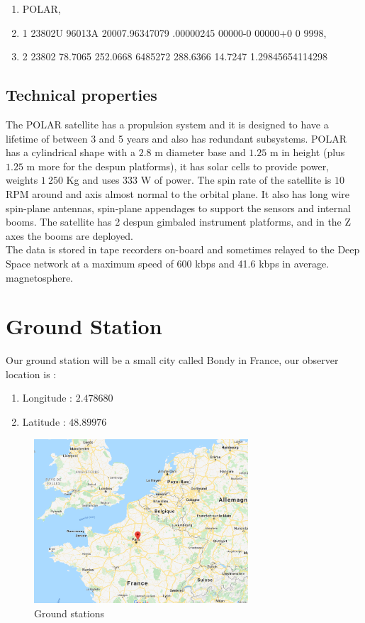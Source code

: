 \documentclass[a4paper,12pt,calibri,oneside,openany]{book}
\theoremstyle{break}
\begin{document}
\begin{enumerate}
	\item POLAR,                  
	\item 1 23802U 96013A   20007.96347079  .00000245  00000-0  00000+0 0  9998,
	\item 2 23802  78.7065 252.0668 6485272 288.6366  14.7247  1.29845654114298
\end{enumerate}

\subsection{Technical properties} \label{tecprop}
The POLAR satellite has a propulsion system and it is designed to have a lifetime of between 3 and 5 years and also has redundant subsystems. POLAR has a cylindrical shape with a $2.8$ m diameter base and $1.25$ m in height (plus $1.25$ m more for the despun platforms), it has solar cells to provide power, weights $1\ 250$ Kg and uses $333$ W of power. The spin rate of the satellite is $10$ RPM around and axis almost normal to the orbital plane. It also has long wire spin-plane antennas, spin-plane appendages to support the sensors and internal booms. The satellite has 2 despun gimbaled instrument platforms, and in the Z axes the booms are deployed.\\

The data is stored in tape recorders on-board and sometimes relayed to the Deep Space network at a maximum speed of 600 kbps and 41.6 kbps in average.\\
 magnetosphere.

\section{Ground Station}
Our ground station will be a small city called Bondy in France, our observer location is :
\begin{enumerate}
	\item Longitude : $2.478680$
	\item Latitude : $48.89976$
\end{enumerate}
\begin{figure}[h]
	\centering
	\includegraphics[width=8cm]{bondy}
	\caption{Ground stations }
	\label{Ground Station}
\end{figure}
\end{document}

